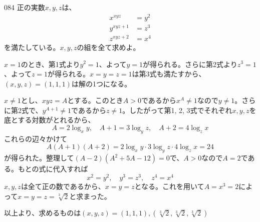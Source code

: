 \begin{thm}{084}{\maru}{}
 正の実数$x, y, z$は、
 \begin{align*}
  x^{xyz}&=y^2 \\
  y^{xyz+1}&=z^3 \\
  z^{xyz+2}&=x^4
 \end{align*}
 を満たしている。$x, y, z$の組を全て求めよ。
\end{thm}

$x=1$のとき、第1式より$y^2=1$、よって$y=1$が得られる。さらに第2式より$z^3=1$、よって$z=1$が得られる。$x=y=z=1$は第3式も満たすから、$(x, y, z)=(1, 1, 1)$は解の1つになる。

$x\neq 1$とし、$xyz=A$とする。このとき$A>0$であるから$x^A\neq 1$なので$y\neq 1$。さらに第2式で、$y^{A+1}\neq 1$であるから$z\neq 1$。したがって第1, 2, 3式でそれぞれ$x, y, z$を底とする対数がとれるから、
\[ A=2\log_x{y},\quad A+1=3\log_y{z},\quad A+2=4\log_z{x} \]
これらの辺々かけて
\[ A(A+1)(A+2)=2\log_x{y}\cdot 3\log_y{z}\cdot 4\log_z{x} = 24 \]
が得られた。整理して$(A-2)(A^2+5A-12)=0$で、$A>0$なので$A=2$である。もとの式に代入すれば
\[ x^2=y^2,\quad y^3=z^3,\quad z^4=x^4 \]
$x, y, z$は全て正の数であるから、$x=y=z$となる。これを用いて$A=x^3=2$によって$x=y=z=\sqrt[3]{2}$と求まった。

以上より、求めるものは$(x, y, z)=(1, 1, 1), (\sqrt[3]{2}, \sqrt[3]{2}, \sqrt[3]{2})$